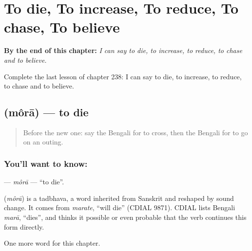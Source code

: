 
\chapter{To die, To increase, To reduce, To chase, To believe}
\label{ch:bn-to-die-to-increase-to-reduce-to-chase-to-believe}

\begin{chapteropening}
\textbf{By the end of this chapter:} \emph{I can say to die, to increase, to reduce, to chase and to believe.}

Complete the last lesson of chapter 238: I can say to die, to increase, to reduce, to chase and to believe.
\end{chapteropening}

\section[\texorpdfstring{\bn{মরা} (môrā)}{মরা (môrā)}]{ (môrā) — to die}

\label{lesson:BN-C238-mora}



\begin{quote}
Before the new one: say the Bengali for to cross, then the Bengali for to go on an outing.
\end{quote}

\subsection*{You'll want to know: }
\textbf{} — \emph{môrā} — \textquotedblleft{}to die\textquotedblright{}.

\begin{cousinweb}
\textbf{} (\emph{môrā}) is a tadbhava, a word inherited from Sanskrit and reshaped by sound change. It comes from \emph{marate}, \textquotedblleft{}will die\textquotedblright{} (CDIAL 9871). CDIAL lists Bengali \emph{marā}, \textquotedblleft{}dies\textquotedblright{}, and thinks it possible or even probable that the verb continues this form directly.
\end{cousinweb}

\begin{grammarlens}[title={What you've built}]
One more word for this chapter.
\end{grammarlens}

